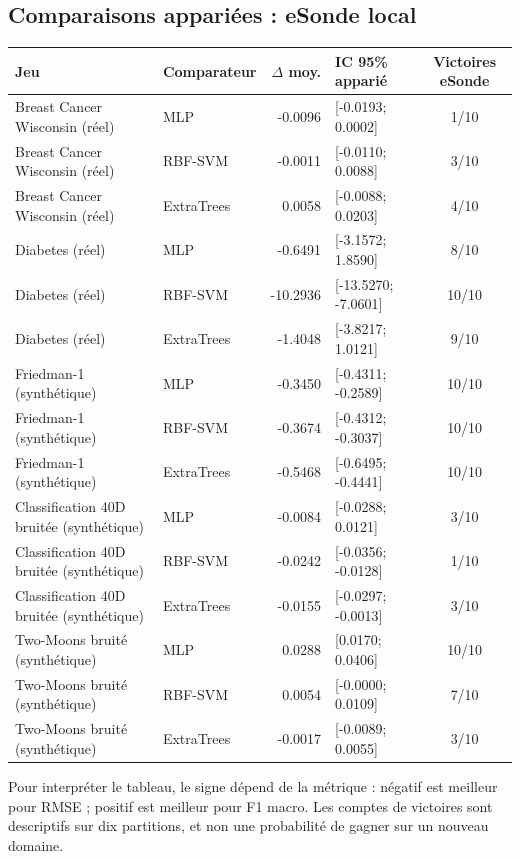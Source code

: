 \documentclass[11pt,a4paper]{article}
\begin{document}
\subsection{Comparaisons appariées : eSonde local}
\begin{longtable}{p{3.2cm}p{2.1cm}r p{4.0cm}c}
\toprule Jeu & Comparateur & $\Delta$ moy. & IC 95\% apparié & Victoires eSonde\\\midrule\endhead
Breast Cancer Wisconsin (réel) & MLP & -0.0096 & [-0.0193; 0.0002] & 1/10 \\
Breast Cancer Wisconsin (réel) & RBF-SVM & -0.0011 & [-0.0110; 0.0088] & 3/10 \\
Breast Cancer Wisconsin (réel) & ExtraTrees & 0.0058 & [-0.0088; 0.0203] & 4/10 \\
Diabetes (réel) & MLP & -0.6491 & [-3.1572; 1.8590] & 8/10 \\
Diabetes (réel) & RBF-SVM & -10.2936 & [-13.5270; -7.0601] & 10/10 \\
Diabetes (réel) & ExtraTrees & -1.4048 & [-3.8217; 1.0121] & 9/10 \\
Friedman-1 (synthétique) & MLP & -0.3450 & [-0.4311; -0.2589] & 10/10 \\
Friedman-1 (synthétique) & RBF-SVM & -0.3674 & [-0.4312; -0.3037] & 10/10 \\
Friedman-1 (synthétique) & ExtraTrees & -0.5468 & [-0.6495; -0.4441] & 10/10 \\
Classification 40D bruitée (synthétique) & MLP & -0.0084 & [-0.0288; 0.0121] & 3/10 \\
Classification 40D bruitée (synthétique) & RBF-SVM & -0.0242 & [-0.0356; -0.0128] & 1/10 \\
Classification 40D bruitée (synthétique) & ExtraTrees & -0.0155 & [-0.0297; -0.0013] & 3/10 \\
Two-Moons bruité (synthétique) & MLP & 0.0288 & [0.0170; 0.0406] & 10/10 \\
Two-Moons bruité (synthétique) & RBF-SVM & 0.0054 & [-0.0000; 0.0109] & 7/10 \\
Two-Moons bruité (synthétique) & ExtraTrees & -0.0017 & [-0.0089; 0.0055] & 3/10 \\
\bottomrule\end{longtable}
Pour interpréter le tableau, le signe dépend de la métrique : négatif est meilleur pour RMSE ; positif est meilleur pour F1 macro. Les comptes de victoires sont descriptifs sur dix partitions, et non une probabilité de gagner sur un nouveau domaine.
\end{document}
